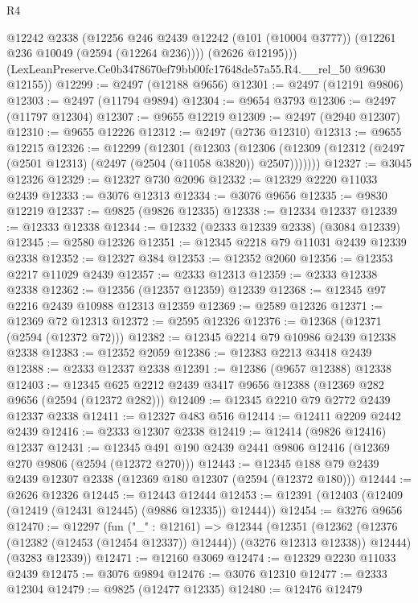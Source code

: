 \begin{lexlean}{R4}
\begin{coremodule}
          @12242
          @2338
          (@12256
            @246
            @2439
            @12242
            (@101 (@10004 @3777))
            (@12261 @236 @10049 (@2594 (@12264 @236))))
          (@2626 @12195)))
      (LexLeanPreserve.Ce0b3478670ef79bb00fc17648de57a55.R4.__rel_50 @9630 @12155))
@12299 := @2497 (@12188 @9656)
@12301 := @2497 (@12191 @9806)
@12303 := @2497 (@11794 @9894)
@12304 := @9654 @3793
@12306 := @2497 (@11797 @12304)
@12307 := @9655 @12219
@12309 := @2497 (@2940 @12307)
@12310 := @9655 @12226
@12312 := @2497 (@2736 @12310)
@12313 := @9655 @12215
@12326 := @12299
    (@12301
      (@12303
        (@12306 (@12309 (@12312 (@2497 (@2501 @12313) (@2497 (@2504 (@11058 @3820)) @2507)))))))
@12327 := @3045 @12326
@12329 := @12327 @730 @2096
@12332 := @12329 @2220 @11033 @2439
@12333 := @3076 @12313
@12334 := @3076 @9656
@12335 := @9830 @12219
@12337 := @9825 (@9826 @12335)
@12338 := @12334 @12337
@12339 := @12333 @12338
@12344 := @12332 (@2333 @12339 @2338) (@3084 @12339)
@12345 := @2580 @12326
@12351 := @12345 @2218 @79 @11031 @2439 @12339 @2338
@12352 := @12327 @384
@12353 := @12352 @2060
@12356 := @12353 @2217 @11029 @2439
@12357 := @2333 @12313
@12359 := @2333 @12338 @2338
@12362 := @12356 (@12357 @12359) @12339
@12368 := @12345 @97 @2216 @2439 @10988 @12313 @12359
@12369 := @2589 @12326
@12371 := @12369 @72 @12313
@12372 := @2595 @12326
@12376 := @12368 (@12371 (@2594 (@12372 @72)))
@12382 := @12345 @2214 @79 @10986 @2439 @12338 @2338
@12383 := @12352 @2059
@12386 := @12383 @2213 @3418 @2439
@12388 := @2333 @12337 @2338
@12391 := @12386 (@9657 @12388) @12338
@12403 := @12345 @625 @2212 @2439 @3417 @9656 @12388 (@12369 @282 @9656 (@2594 (@12372 @282)))
@12409 := @12345 @2210 @79 @2772 @2439 @12337 @2338
@12411 := @12327 @483 @516
@12414 := @12411 @2209 @2442 @2439
@12416 := @2333 @12307 @2338
@12419 := @12414 (@9826 @12416) @12337
@12431 := @12345 @491 @190 @2439 @2441 @9806 @12416 (@12369 @270 @9806 (@2594 (@12372 @270)))
@12443 := @12345 @188 @79 @2439 @2439 @12307 @2338 (@12369 @180 @12307 (@2594 (@12372 @180)))
@12444 := @2626 @12326
@12445 := @12443 @12444
@12453 := @12391 (@12403 (@12409 (@12419 (@12431 @12445) (@9886 @12335)) @12444))
@12454 := @3276 @9656
@12470 := @12297
    (fun ("_" : @12161) =>
    @12344
      (@12351
        (@12362 (@12376 (@12382 (@12453 (@12454 @12337)) @12444)) (@3276 @12313 @12338))
        @12444)
      (@3283 @12339))
@12471 := @12160 @3069
@12474 := @12329 @2230 @11033 @2439
@12475 := @3076 @9894
@12476 := @3076 @12310
@12477 := @2333 @12304
@12479 := @9825 (@12477 @12335)
@12480 := @12476 @12479

\end{coremodule}
\end{lexlean}
